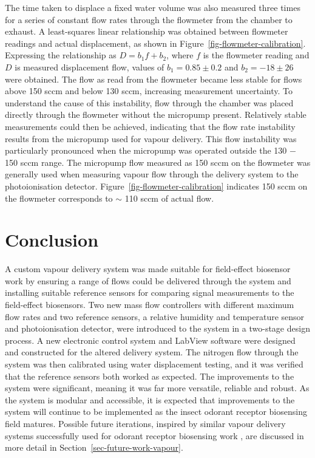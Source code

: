 \documentclass[
  a4paper,
]{scrbook}
\begin{document}
The time taken to displace a fixed water volume was also measured three
times for a series of constant flow rates through the flowmeter from the
chamber to exhaust. A least-squares linear relationship was obtained
between flowmeter readings and actual displacement, as shown in
Figure~\ref{fig-flowmeter-calibration}. Expressing the relationship as
\(D = b_1f + b_2\), where \(f\) is the flowmeter reading and \(D\) is
measured displacement flow, values of \(b_1 = 0.85\pm0.2\) and
\(b_2 = -18\pm26\) were obtained. The flow as read from the flowmeter
became less stable for flows above 150 sccm and below 130 sccm,
increasing measurement uncertainty. To understand the cause of this
instability, flow through the chamber was placed directly through the
flowmeter without the micropump present. Relatively stable measurements
could then be achieved, indicating that the flow rate instability
results from the micropump used for vapour delivery. This flow
instability was particularly pronounced when the micropump was operated
outside the 130 \(-\) 150 sccm range. The micropump flow measured as 150
sccm on the flowmeter was generally used when measuring vapour flow
through the delivery system to the photoionisation detector.
Figure~\ref{fig-flowmeter-calibration} indicates 150 sccm on the
flowmeter corresponds to \(\sim\) 110 sccm of actual flow.

\hypertarget{conclusion-2}{%
\section{Conclusion}\label{conclusion-2}}

A custom vapour delivery system was made suitable for field-effect
biosensor work by ensuring a range of flows could be delivered through
the system and installing suitable reference sensors for comparing
signal measurements to the field-effect biosensors. Two new mass flow
controllers with different maximum flow rates and two reference sensors,
a relative humidity and temperature sensor and photoionisation detector,
were introduced to the system in a two-stage design process. A new
electronic control system and LabView software were designed and
constructed for the altered delivery system. The nitrogen flow through
the system was then calibrated using water displacement testing, and it
was verified that the reference sensors both worked as expected. The
improvements to the system were significant, meaning it was far more
versatile, reliable and robust. As the system is modular and accessible,
it is expected that improvements to the system will continue to be
implemented as the insect odorant receptor biosensing field matures.
Possible future iterations, inspired by similar vapour delivery systems
successfully used for odorant receptor biosensing work
\autocite{Terutsuki2020,Hirata2021}, are discussed in more detail in
Section~\ref{sec-future-work-vapour}.
\end{document}
